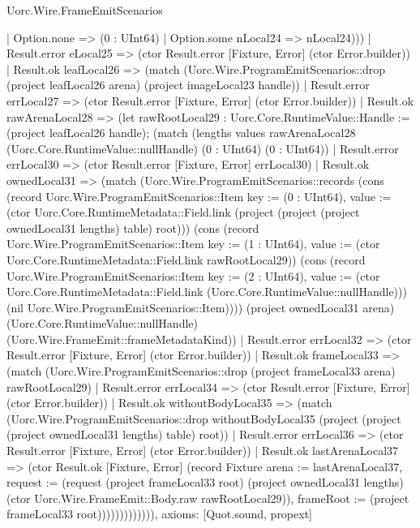 \begin{lexlean}{Uorc.Wire.FrameEmitScenarios}
\begin{semanticmodule}
{        | Option.none => (0 : UInt64)
        | Option.some nLocal24 => nLocal24)))
      | Result.error eLocal25 => (ctor Result.error [Fixture, Error] (ctor Error.builder))
      | Result.ok leafLocal26 => (match (Uorc.Wire.ProgramEmitScenarios::drop (project leafLocal26 arena) (project imageLocal23 handle))
        | Result.error errLocal27 => (ctor Result.error [Fixture, Error] (ctor Error.builder))
        | Result.ok rawArenaLocal28 => (let rawRootLocal29 : Uorc.Core.RuntimeValue::Handle := (project leafLocal26 handle); (match (lengths values rawArenaLocal28 (Uorc.Core.RuntimeValue::nullHandle) (0 : UInt64) (0 : UInt64))
          | Result.error errLocal30 => (ctor Result.error [Fixture, Error] errLocal30)
          | Result.ok ownedLocal31 => (match (Uorc.Wire.ProgramEmitScenarios::records (cons (record Uorc.Wire.ProgramEmitScenarios::Item {key := (0 : UInt64), value := (ctor Uorc.Core.RuntimeMetadata::Field.link (project (project (project ownedLocal31 lengths) table) root))}) (cons (record Uorc.Wire.ProgramEmitScenarios::Item {key := (1 : UInt64), value := (ctor Uorc.Core.RuntimeMetadata::Field.link rawRootLocal29)}) (cons (record Uorc.Wire.ProgramEmitScenarios::Item {key := (2 : UInt64), value := (ctor Uorc.Core.RuntimeMetadata::Field.link (Uorc.Core.RuntimeValue::nullHandle))}) (nil Uorc.Wire.ProgramEmitScenarios::Item)))) (project ownedLocal31 arena) (Uorc.Core.RuntimeValue::nullHandle) (Uorc.Wire.FrameEmit::frameMetadataKind))
            | Result.error errLocal32 => (ctor Result.error [Fixture, Error] (ctor Error.builder))
            | Result.ok frameLocal33 => (match (Uorc.Wire.ProgramEmitScenarios::drop (project frameLocal33 arena) rawRootLocal29)
              | Result.error errLocal34 => (ctor Result.error [Fixture, Error] (ctor Error.builder))
              | Result.ok withoutBodyLocal35 => (match (Uorc.Wire.ProgramEmitScenarios::drop withoutBodyLocal35 (project (project (project ownedLocal31 lengths) table) root))
                | Result.error errLocal36 => (ctor Result.error [Fixture, Error] (ctor Error.builder))
                | Result.ok lastArenaLocal37 => (ctor Result.ok [Fixture, Error] (record Fixture {arena := lastArenaLocal37, request := (request (project frameLocal33 root) (project ownedLocal31 lengths) (ctor Uorc.Wire.FrameEmit::Body.raw rawRootLocal29)), frameRoot := (project frameLocal33 root)})))))))))))),
  axioms: [Quot.sound, propext]
}


\end{semanticmodule}
\end{lexlean}
